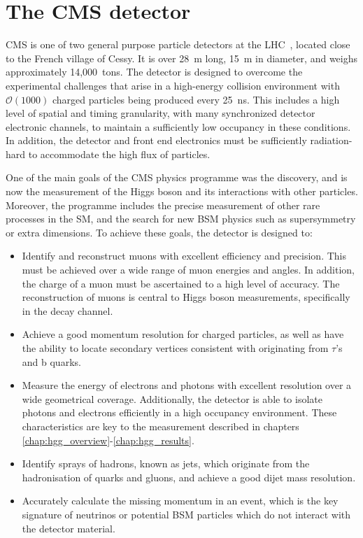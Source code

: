 \section{The CMS detector}\label{sec:cms}
CMS is one of two general purpose particle detectors at the LHC~\cite{Chatrchyan:2008zzk}, located close to the French village of Cessy. It is over 28~m long, 15~m in diameter, and weighs approximately 14,000~tons. The detector is designed to overcome the experimental challenges that arise in a high-energy collision environment with $\mathcal{O}(1000)$ charged particles being produced every 25~ns. This includes a high level of spatial and timing granularity, with many synchronized detector electronic channels, to maintain a sufficiently low occupancy in these conditions. In addition, the detector and front end electronics must be sufficiently radiation-hard to accommodate the high flux of particles.

One of the main goals of the CMS physics programme was the discovery, and is now the measurement of the Higgs boson and its interactions with other particles. Moreover, the programme includes the precise measurement of other rare processes in the SM, and the search for new BSM physics such as supersymmetry or extra dimensions. To achieve these goals, the detector is designed to:

\begin{itemize}
    \item Identify and reconstruct muons with excellent efficiency and precision. This must be achieved over a wide range of muon energies and angles. In addition, the charge of a muon must be ascertained to a high level of accuracy. The reconstruction of muons is central to Higgs boson measurements, specifically in the \Hfl decay channel.
    \item Achieve a good momentum resolution for charged particles, as well as have the ability to locate secondary vertices consistent with originating from $\tau$'s and b quarks.
    \item Measure the energy of electrons and photons with excellent resolution over a wide geometrical coverage. Additionally, the detector is able to isolate photons and electrons efficiently in a high occupancy environment. These characteristics are key to the \Hgg measurement described in chapters \ref{chap:hgg_overview}-\ref{chap:hgg_results}.
    \item Identify sprays of hadrons, known as jets, which originate from the hadronisation of quarks and gluons, and achieve a good dijet mass resolution.
    \item Accurately calculate the missing momentum in an event, which is the key signature of neutrinos or potential BSM particles which do not interact with the detector material.
\end{itemize}

